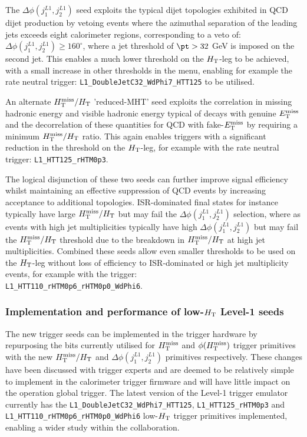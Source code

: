 The $\Delta\phi(j_{1}^{L1},j_{2}^{L1})$ seed exploits the typical dijet topologies exhibited in QCD dijet production by vetoing events where the azimuthal separation of the leading jets exceeds eight calorimeter regions, corresponding to a veto of: $\Delta\phi(j_{1}^{L1},j_{2}^{L1}) \ge 160^{\circ}$, where a jet threshold of $\pt > 32$ GeV is imposed on the second jet. This enables a much lower threshold on the $\mbox{$H_\text{T}$}$-leg to be achieved, with a small increase in other thresholds in the menu, enabling for example the rate neutral trigger: \verb!L1_DoubleJetC32_WdPhi7_HTT125! to be utilised.

An alternate $\mbox{$H_{\rm T}^{\rm miss}$}/\mbox{$H_\text{T}$}$ 'reduced-MHT' seed exploits the correlation in missing hadronic energy and visible hadronic energy typical of decays with genuine $\mbox{$E_\text{T}^{\rm miss}$}$ and the decorrelation of these quantities for QCD with fake-$\mbox{$E_\text{T}^{\rm miss}$}$ by requiring a minimum $\mbox{$H_{\rm T}^{\rm miss}$}/\mbox{$H_\text{T}$}$ ratio. This again enables triggers with a significant reduction in the threshold on the $\mbox{$H_\text{T}$}$-leg, for example with the rate neutral trigger: \verb!L1_HTT125_rHTM0p3!.

The logical disjunction of these two seeds can further improve signal efficiency whilst maintaining an effective suppression of QCD events by increasing acceptance to additional topologies. ISR-dominated final states for instance typically have large $\mbox{$H_{\rm T}^{\rm miss}$}/\mbox{$H_\text{T}$}$ but may fail the $\Delta\phi(j_{1}^{L1},j_{2}^{L1})$ selection, where as events with high jet multiplicities typically have high $\Delta\phi(j_{1}^{L1},j_{2}^{L1})$ but may fail the $\mbox{$H_{\rm T}^{\rm miss}$}/\mbox{$H_\text{T}$}$ threshold due to the breakdown in $\mbox{$H_{\rm T}^{\rm miss}$}/\mbox{$H_\text{T}$}$ at high jet multiplicities. Combined these seeds allow even smaller thresholds to be used on the $\mbox{$H_\text{T}$}$-leg without loss of efficiency to ISR-dominated or high jet multiplicity events, for example with the trigger:\\ \verb!L1_HTT110_rHTM0p6_rHTM0p0_WdPhi6!.


\subsubsection{Implementation and performance of low-$\mbox{$H_\text{T}$}$ Level-1 seeds}

The new trigger seeds can be implemented in the trigger hardware by repurposing the bits currently utilised for $\mbox{$H_{\rm T}^{\rm miss}$}$ and $\phi({\mbox{$H_{\rm T}^{\rm miss}$}})$ trigger primitives with the new $\mbox{$H_{\rm T}^{\rm miss}$}/\mbox{$H_\text{T}$}$ and $\Delta\phi(j_{1}^{L1},j_{2}^{L1})$ primitives respectively. These changes have been discussed with trigger experts and are deemed to be relatively simple to implement in the calorimeter trigger firmware and will have little impact on the operation global trigger. The latest version of the Level-1 trigger emulator currently has the \verb!L1_DoubleJetC32_WdPhi7_HTT125!, \verb!L1_HTT125_rHTM0p3! and \\ \verb!L1_HTT110_rHTM0p6_rHTM0p0_WdPhi6! low-$\mbox{$H_\text{T}$}$ trigger primitives implemented, enabling a wider study within the collaboration.

